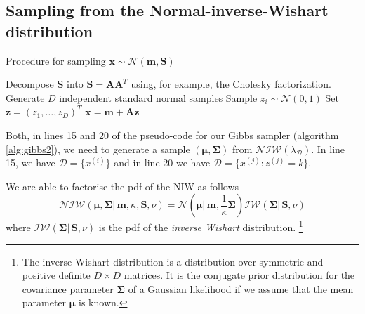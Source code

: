 \documentclass[final,3p,times,twocolumn]{elsarticle}
\let\bs\boldsymbol
\begin{document}
\subsection{Sampling from the Normal-inverse-Wishart distribution}

\begin{algorithm}
\caption{Procedure for sampling $\bs x \sim \mathcal{N}(\bs m,\bs S)$}
\label{alg:gauss}
\begin{algorithmic}[1]
\State Decompose $\bs S$ into $\bs S = \bs A \bs A^T$ using, for example, the Cholesky factorization.
\Statex\State\Comment Generate $D$ independent standard normal samples
\State Sample $z_i \sim \mathcal{N}(0,1)$
\EndFor
\State Set $\bs z = (z_1,\dots,z_D)^T$
\Statex\State\Return $\bs x = \bs m + \bs A \bs z$
\end{algorithmic}
\end{algorithm}

Both, in lines 15 and 20 of the pseudo-code for our Gibbs sampler (algorithm \ref{alg:gibbs2}), we need to generate a sample $(\bs\mu,\bs\Sigma)$ from $\mathcal{NIW}(\lambda_\mathcal{D})$.
In line 15, we have $\mathcal{D} = \{x^{(i)}\}$ and in line 20 we have $\mathcal{D} = \{x^{(j)} : z^{(j)} = k\}$.

We are able to factorise the pdf of the NIW as follows 
\begin{equation}
\mathcal{NIW}(\bs\mu,\bs\Sigma|\,\bs m,\kappa,\bs S,\nu) = \mathcal{N}(\bs\mu|\,\bs m,\frac{1}{\kappa}\bs\Sigma)\mathcal{IW}(\bs\Sigma|\,\bs S,\nu)
\end{equation}
where $\mathcal{IW}(\bs\Sigma|\,\bs S,\nu)$ is the pdf of the \emph{inverse Wishart} distribution.
\footnote{The inverse Wishart distribution is a distribution over symmetric and positive definite $D\times D$ matrices. It is the conjugate prior distribution for the covariance parameter $\bs\Sigma$ of a Gaussian likelihood if we assume that the mean parameter $\bs\mu$ is known.}
\end{document}
